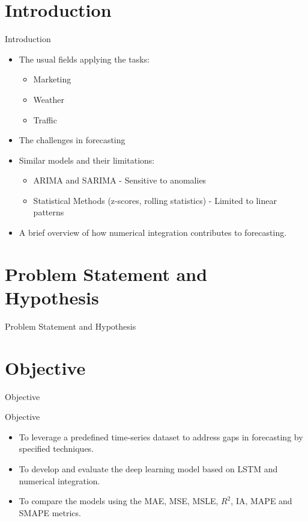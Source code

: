 \documentclass[pt]{beamer}
\newenvironment{tres important}[2][]{
	\setkeys{EmphEqEnv}{#2}
	\setkeys{EmphEqOpt}{box={\setlength{\fboxsep}{10pt}\fcolorbox{myNewColorA}{white}},#1}
	\EmphEqMainEnv}
{\endEmphEqMainEnv}
\begin{document}
\section{Introduction}
\begin{frame}{Introduction}
\begin{itemize}
    \item The usual fields applying the tasks:
    \begin{itemize}
        \item Marketing
        \item Weather
        \item Traffic
    \end{itemize}
    \item The challenges in forecasting
    \item Similar models and their limitations:
    \begin{itemize}
        \item ARIMA and SARIMA - Sensitive to anomalies
        \item Statistical Methods (z-scores, rolling statistics) - Limited to linear patterns
    \end{itemize}
    \item A brief overview of how numerical integration contributes to forecasting.
\end{itemize}
\end{frame}


\section{Problem Statement and Hypothesis}
\begin{frame}{Problem Statement and Hypothesis}
\end{frame}

\section{Objective}
\begin{frame}{Objective}
    \item Objective \begin{itemize}
    \vspace{1em}
        \item To leverage a predefined time-series dataset to address gaps in forecasting by specified techniques.
        \item To develop and evaluate the deep learning model based on LSTM and numerical integration.
        \item To compare the models using the MAE, MSE, MSLE, $R^2$, IA, MAPE and SMAPE metrics.
    \end{itemize}
\end{frame}
\end{document}
